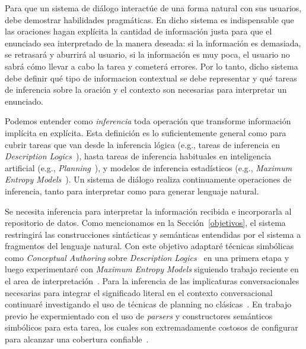 \documentclass[11pt]{article}
\begin{document}
Para que un sistema de di\'alogo interact\'ue de una forma natural con sus
usuarios, debe demostrar habilidades pragm\'aticas. En dicho sistema es
indispensable que las oraciones hagan expl\'icita la cantidad de informaci\'on
justa para que el enunciado sea interpretado de la manera deseada: si la
informaci\'on es demasiada, se retrasar\'a y aburrir\'a al usuario, si la
informaci\'on es muy
poca, el usuario no sabr\'a c\'omo llevar a cabo la tarea y cometer\'a errores. 
Por lo tanto, dicho sistema
debe definir qu\'e tipo de informacion contextual se debe representar y
qu\'e tareas de inferencia sobre la oraci\'on y el contexto son necesarias para
interpretar un enunciado. 

Podemos entender como \emph{inferencia} toda operaci\'on que transforme
informaci\'on
impl\'icita en expl\'icita.  Esta definici\'on es lo
suficientemente general como para cubrir tareas que van desde la inferencia
l\'ogica (e.g., tareas de inferencia en
\emph{Description Logics}~\citep{DBLP:conf/dlog/2003handbook}), hasta tareas de
inferencia habituales en inteligencia artificial (e.g.,
\emph{Planning}~\citep{nau04}), y modelos de inferencia estad\'isticos (e.g.,
\emph{Maximum Entropy Models}~\citep{berger96}). Un sistema de di\'alogo realiza
continuamente operaciones de inferencia, tanto para interpretar como para
generar lenguaje natural. 

Se necesita inferencia para interpretar la informaci\'on recibida e incorporarla
al repositorio de datos. Como mencionamos en la Secci\'on~\ref{objetivos}, el
sistema restringir\'a las
construcciones sint\'acticas y sem\'anticas entendidas por el sistema a
fragmentos del lenguaje natural. Con este objetivo adaptar\'e t\'ecnicas
simb\'olicas como
\emph{Conceptual Authoring} sobre \emph{Description
Logics}~\citep{hallett07,piwek07} en una primera etapa y luego experimentar\'e
con
\emph{Maximum Entropy Models} siguiendo trabajo
reciente en el area de interpretaci\'on~\citep{sagae09}. Para la
inferencia de las implicaturas conversacionales necesarias para integrar el
significado literal en el contexto conversacional continuar\'e investigando el
uso de t\'ecnicas de planning no
cl\'asicas~\citep{benotti08, benotti09a, benotti10}. En trabajo previo he
expermientado con el uso de \emph{parsers} y constructores sem\'anticos
simb\'olicos
para esta tarea, los cuales son extremadamente costosos de
configurar para alcanzar una cobertura confiable~\citep{benotti09b,benotti10}. 
\end{document}
